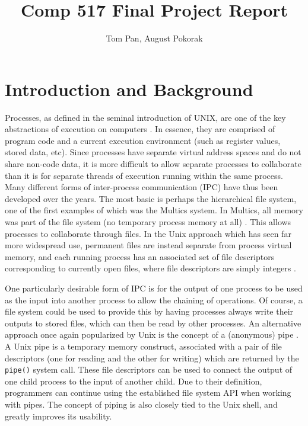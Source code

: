 \usepackage{filecontents}

\usepackage{listings}

\title{Comp 517 Final Project Report}
\author{Tom Pan, August Pokorak}



\maketitle

\section{Introduction and Background}

Processes, as defined in the seminal introduction of UNIX, are one of the key abstractions of execution on computers \cite{unix1}.  In essence, they are comprised of program code and a current execution environment (such as register values, stored data, etc).  Since processes have separate virtual address spaces and do not share non-code data, it is more difficult to allow separate processes to collaborate than it is for separate threads of execution running within the same process.  Many different forms of inter-process communication (IPC) have thus been developed over the years.  The most basic is perhaps the hierarchical file system, one of the first examples of which was the Multics system.  In Multics, all memory was part of the file system (no temporary process memory at all) \cite{multics}. This allows processes to collaborate through files. In the Unix approach which has seen far more widespread use, permanent files are instead separate from process virtual memory, and each running process has an associated set of file descriptors corresponding to currently open files, where file descriptors are simply integers \cite{unix1}.

One particularly desirable form of IPC is for the output of one process to be used as the input into another process to allow the chaining of operations. Of course, a file system could be used to provide this by having processes always write their outputs to stored files, which can then be read by other processes. An alternative approach once again popularized by Unix is the concept of a (anonymous) pipe \cite{unix1}.  A Unix pipe is a temporary memory construct, associated with a pair of file descriptors (one for reading and the other for writing) which are returned by the \texttt{pipe()} system call. These file descriptors can be used to connect the output of one child process to the input of another child. Due to their definition, programmers can continue using the established file system API when working with pipes. The concept of piping is also closely tied to the Unix shell, and greatly improves its usability.

